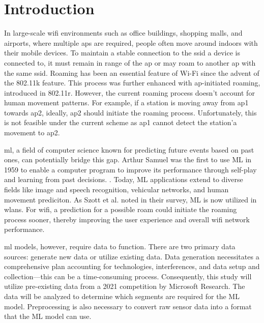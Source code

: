 \chapter{Introduction}\label{sec:intro}



In large-scale \ac{wifi} environments such as office buildings, shopping malls, and airports, where multiple \acp{ap} are required, people often move around indoors with their mobile devices.
To maintain a stable connection to the \ac{ssid} a device is connected to, it must remain in range of the \ac{ap} or may roam to another \ac{ap} with the same \ac{ssid}.
Roaming has been an essential feature of Wi-Fi since the advent of the 802.11k\cite{802.11k} feature.
This process was further enhanced with \ac{ap}-initiated roaming, introduced in 802.11r\cite{802.11r}.
However, the current roaming process doesn't account for human movement patterns. 
For example, if a station is moving away from \ac{ap}1 towards \ac{ap}2, ideally, \ac{ap}2 should initiate the roaming process.
Unfortunately, this is not feasible under the current scheme as \ac{ap}1 cannot detect the station'a movement to \ac{ap}2.

\ac{ml}, a field of computer science known for predicting future events based on past ones, can potentially bridge this gap. 
Arthur Samuel was the first to use ML in 1959 to enable a computer program to improve its performance through self-play and learning from past decisions. \cite{SamuelML}.
Today, ML applications extend to diverse fields like image and speech recognition, vehicular networks\cite{MachineLearningVehicular}, and human movement prediciton\cite{asaharaPedestrianmovementPredictionBased2011}.
As Szott et al. noted in their survey\cite{szottWiFiMeetsML2022}, ML is now utilized in \acp{wlan}.
For \ac{wifi}, a prediction for a possible roam could initiate the roaming process sooner, thereby improving the user experience and overall \ac{wifi} network performance.

\ac{ml} models, however, require data to function. 
There are two primary data sources: generate new data or utilize existing data. 
Data generation necessitates a comprehensive plan accounting for technologies, interferences, and data setup and collection—this can be a time-consuming process. 
Consequently, this study will utilize pre-existing data from a 2021 competition by Microsoft Research\cite{IndoorLocationNavigation}. 
The data will be analyzed to determine which segments are required for the ML model. 
Preprocessing is also necessary to convert raw sensor data into a format that the ML model can use.

